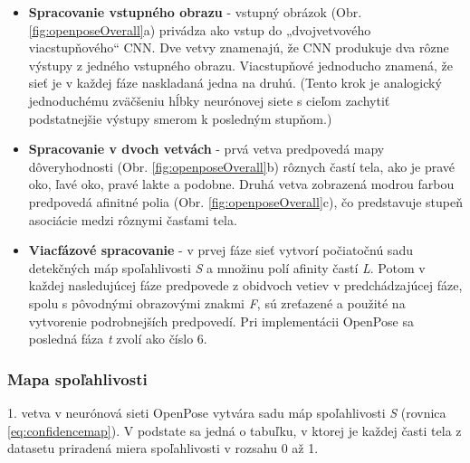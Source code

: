 \documentclass[slovak,master,dept460,male,cpp,cpdeclaration]{diploma}
\begin{document}
\begin{itemize}
\item \textbf{Spracovanie vstupného obrazu} - vstupný obrázok (Obr. \ref{fig:openposeOverall}a) privádza ako vstup do „dvojvetvového viacstupňového“ CNN. Dve vetvy znamenajú, že CNN produkuje dva rôzne výstupy z jedného vstupného obrazu. Viacstupňové jednoducho znamená, že sieť je v každej fáze naskladaná jedna na druhú. (Tento krok je analogický jednoduchému zväčšeniu hĺbky neurónovej siete s cieľom zachytiť podstatnejšie výstupy smerom k posledným stupňom.)

\item \textbf{Spracovanie v dvoch vetvách} - prvá vetva predpovedá mapy dôveryhodnosti (Obr. \ref{fig:openposeOverall}b) rôznych častí tela, ako je pravé oko, ľavé oko, pravé lakte a podobne. Druhá vetva zobrazená modrou farbou predpovedá afinitné polia (Obr. \ref{fig:openposeOverall}c), čo predstavuje stupeň asociácie medzi rôznymi časťami tela.

\item \textbf{Viacfázové spracovanie} - v prvej fáze sieť vytvorí počiatočnú sadu detekčných máp spoľahlivosti \textit{S} a množinu polí afinity častí \textit{L}. Potom v každej nasledujúcej fáze predpovede z obidvoch vetiev v predchádzajúcej fáze, spolu s pôvodnými obrazovými znakmi \textit{F}, sú zreťazené a použité na vytvorenie podrobnejších predpovedí. Pri implementácii OpenPose sa posledná fáza \textit{t} zvolí ako  číslo 6.
\end{itemize}

\subsubsection{Mapa spoľahlivosti}
1. vetva v neurónová sieti OpenPose vytvára sadu máp spoľahlivosti \textit{S} (rovnica \ref{eq:confidencemap}). V podstate sa jedná o tabuľku, v ktorej je každej časti tela z datasetu priradená miera spoľahlivosti v rozsahu 0 až 1. 
\end{document}
